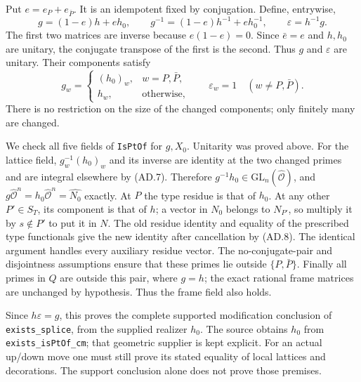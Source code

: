 \documentclass[11pt,a4paper]{article}
\numberwithin{equation}{section}
\theoremstyle{remark}\newtheorem{remark}[theorem]{Remark}
\begin{document}
Put $e=e_P+e_{\bar P}$. It is an idempotent fixed by conjugation.
Define, entrywise,
\[
 g=(1-e)h+eh_0,\qquad
 g^{-1}=(1-e)h^{-1}+eh_0^{-1},\qquad
 \varepsilon=h^{-1}g.                                \tag{AD.9}
\]
The first two matrices are inverse because $e(1-e)=0$.
Since $\bar e=e$ and $h,h_0$ are unitary, the conjugate
transpose of the first is the second. Thus $g$ and
$\varepsilon$ are unitary. Their components satisfy
\[
 g_w=\begin{cases}(h_0)_w,&w=P,\bar P,\\h_w,&\text{otherwise},
       \end{cases}
 \qquad \varepsilon_w=1\quad(w\ne P,\bar P).          \tag{AD.10}
\]
There is no restriction on the size of the changed components;
only finitely many are changed.

We check all five fields of \texttt{IsPtOf} for $g,X_0$.
Unitarity was proved above. For the lattice field,
$g_w^{-1}(h_0)_w$ and its inverse are identity at the two
changed primes and are integral elsewhere by (AD.7).
Therefore $g^{-1}h_0\in\mathrm{GL}_n(\widehat{\mathcal O})$,
and $g\widehat{\mathcal O}^n=h_0\widehat{\mathcal O}^n
=\widehat{N_0}$ exactly.
At $P$ the type residue is that of $h_0$. At any other
$P'\in S_T$, its component is that of $h$; a vector in
$N_0$ belongs to $N_{P'}$, so multiply it by $s\notin P'$
to put it in $N$. The old residue identity and equality
of the prescribed type functionals give the new identity
after cancellation by (AD.8).
The identical argument handles every auxiliary residue vector.
The no-conjugate-pair and disjointness assumptions ensure that
these primes lie outside $\{P,\bar P\}$. Finally all primes
in $Q$ are outside this pair, where $g=h$; the exact rational
frame matrices are unchanged by hypothesis. Thus the frame
field also holds.

Since $h\varepsilon=g$, this proves the complete supported
modification conclusion of \texttt{exists\_\allowbreak splice}, from
the supplied realizer $h_0$. The source obtains $h_0$ from
\texttt{exists\_\allowbreak isPtOf\_\allowbreak cm}; that geometric supplier is
kept explicit. For an actual up/down move one must still
prove its stated equality of local lattices and decorations.
The support conclusion alone does not prove those premises.
\end{document}
